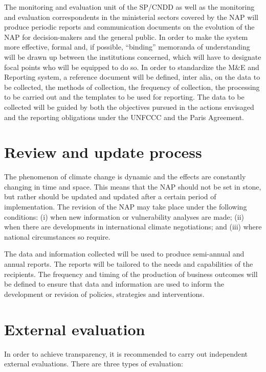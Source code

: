 \documentclass[
]{book}
\begin{document}
The monitoring and evaluation unit of the SP/CNDD as well as the monitoring and evaluation correspondents in the ministerial sectors covered by the NAP will produce periodic reports and communication documents on the evolution of the NAP for decision-makers and the general public. In order to make the system more effective, formal and, if possible, ``binding'' memoranda of understanding will be drawn up between the institutions concerned, which will have to designate focal points who will be equipped to do so. In order to standardize the M\&E and Reporting system, a reference document will be defined, inter alia, on the data to be collected, the methods of collection, the frequency of collection, the processing to be carried out and the templates to be used for reporting. The data to be collected will be guided by both the objectives pursued in the actions envisaged and the reporting obligations under the UNFCCC and the Paris Agreement.

\section{Review and update process}\label{review-and-update-process}

The phenomenon of climate change is dynamic and the effects are constantly changing in time and space. This means that the NAP should not be set in stone, but rather should be updated and updated after a certain period of implementation. The revision of the NAP may take place under the following conditions: (i) when new information or vulnerability analyses are made; (ii) when there are developments in international climate negotiations; and (iii) where national circumstances so require.

The data and information collected will be used to produce semi-annual and annual reports. The reports will be tailored to the needs and capabilities of the recipients. The frequency and timing of the production of business outcomes will be defined to ensure that data and information are used to inform the development or revision of policies, strategies and interventions.

\section{External evaluation}\label{external-evaluation}

In order to achieve transparency, it is recommended to carry out independent external evaluations. There are three types of evaluation:
\end{document}
